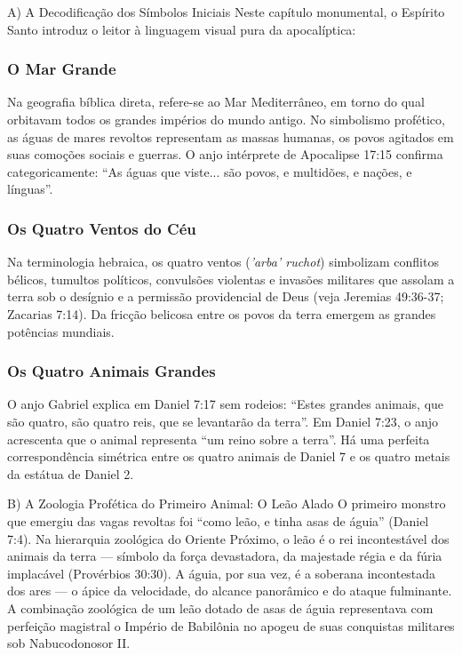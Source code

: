 A) A Decodificação dos Símbolos Iniciais
Neste capítulo monumental, o Espírito Santo introduz o leitor à linguagem visual pura da apocalíptica:

\subsubsection*{O Mar Grande}
Na geografia bíblica direta, refere-se ao Mar Mediterrâneo, em torno do qual orbitavam todos os grandes impérios do mundo antigo. No simbolismo profético, as águas de mares revoltos representam as massas humanas, os povos agitados em suas comoções sociais e guerras. O anjo intérprete de Apocalipse 17:15 confirma categoricamente: ``As águas que viste... são povos, e multidões, e nações, e línguas''.

\subsubsection*{Os Quatro Ventos do Céu}
Na terminologia hebraica, os quatro ventos (\textit{'arba' ruchot}) simbolizam conflitos bélicos, tumultos políticos, convulsões violentas e invasões militares que assolam a terra sob o desígnio e a permissão providencial de Deus (veja Jeremias 49:36-37; Zacarias 7:14). Da fricção belicosa entre os povos da terra emergem as grandes potências mundiais.

\subsubsection*{Os Quatro Animais Grandes}
O anjo Gabriel explica em Daniel 7:17 sem rodeios: ``Estes grandes animais, que são quatro, são quatro reis, que se levantarão da terra''. Em Daniel 7:23, o anjo acrescenta que o animal representa ``um reino sobre a terra''. Há uma perfeita correspondência simétrica entre os quatro animais de Daniel 7 e os quatro metais da estátua de Daniel 2.

B) A Zoologia Profética do Primeiro Animal: O Leão Alado
O primeiro monstro que emergiu das vagas revoltas foi ``como leão, e tinha asas de águia'' (Daniel 7:4). Na hierarquia zoológica do Oriente Próximo, o leão é o rei incontestável dos animais da terra — símbolo da força devastadora, da majestade régia e da fúria implacável (Provérbios 30:30). A águia, por sua vez, é a soberana incontestada dos ares — o ápice da velocidade, do alcance panorâmico e do ataque fulminante. A combinação zoológica de um leão dotado de asas de águia representava com perfeição magistral o Império de Babilônia no apogeu de suas conquistas militares sob Nabucodonosor II.


